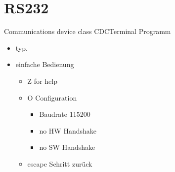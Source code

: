 \section{RS232}
\begin{frame}{Communications device class CDC}{Terminal Programm }
 \begin{itemize}
  \item {}  typ. 
  \item einfache Bedienung
  \begin{itemize} 
   \item {} Z for help
   \item {} O Configuration
   \begin{itemize}
    \item Baudrate 115200
    \item no HW Handshake
    \item no SW Handshake
   \end{itemize}
   \item {} escape Schritt zurück
  \end{itemize}
 \end{itemize}
\end{frame}

